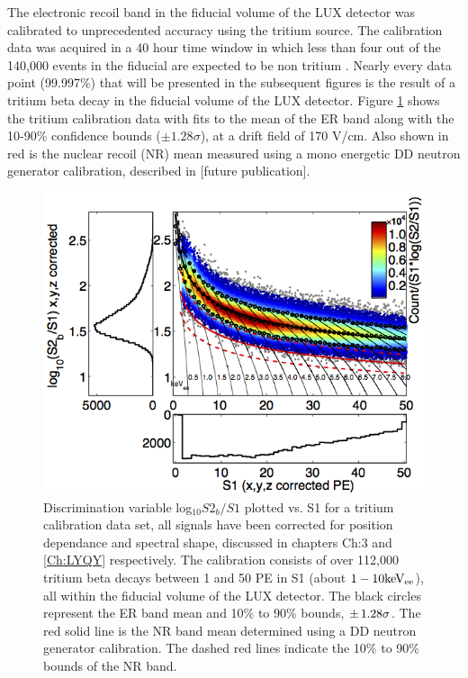 The electronic recoil band in the fiducial volume of the LUX detector was calibrated to unprecedented accuracy using the tritium source. The calibration data was acquired in a 40 hour time window in which less than four out of the 140,000 events in the fiducial are expected to be non tritium \cite{LUX_BG}.  Nearly every data point (99.997\%) that will be presented in the subsequent figures is the result of a tritium beta decay in the fiducial volume of the LUX detector. Figure \ref{fig:Band} shows the tritium calibration data with fits to the mean of the ER band along with the 10-90\% confidence bounds ($\pm 1.28\sigma$), at a drift field of 170 V/cm. Also shown in red is the nuclear recoil (NR) mean measured using a mono energetic DD neutron generator calibration, described in [future publication].

\renewcommand{\baselinestretch}{1}
\small\normalsize
\begin{figure}[h!]\centering
\includegraphics[width=150mm]{Chapter_T/Figures/ER_Band/CH3T_fid_50_proj.png}
\caption{Discrimination variable log$_{10}S2_b/S1$ plotted vs. S1 for a tritium calibration data set, all signals have been corrected for position dependance and spectral shape, discussed in chapters {Ch:3} and \ref{Ch:LYQY} respectively. The calibration consists of over 112,000 tritium beta decays between 1 and 50 PE in S1 (about $\rm1-10 keV_{ee}$), all within the fiducial volume of the LUX detector. The black circles represent the ER band mean and 10\% to 90\% bounds, $\rm \pm \,1.28\sigma$. The red solid line is the NR band mean determined using a DD neutron generator calibration. The dashed red lines indicate the 10\% to 90\% bounds of the NR band.}
\label{fig:Band}
\end{figure}
\renewcommand{\baselinestretch}{2}
\small\normalsize

